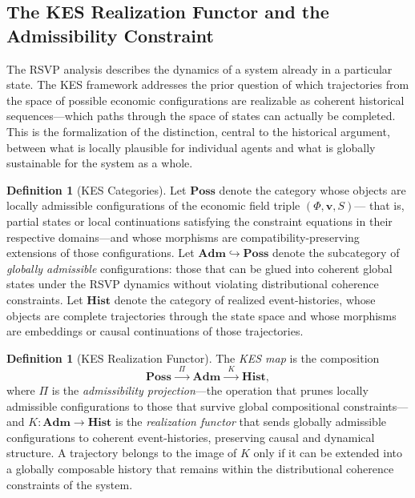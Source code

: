 \documentclass[11pt, a4paper]{article}
\theoremstyle{plain}
\theoremstyle{definition}
\newtheorem{definition}[theorem]{Definition}
\newcommand{\Phifield}{\Phi}
\newcommand{\vfield}{\mathbf{v}}
\newcommand{\Sfield}{S}
\newcommand{\Poss}{\mathbf{Poss}}
\newcommand{\Adm}{\mathbf{Adm}}
\newcommand{\Hist}{\mathbf{Hist}}
\newcommand{\KES}{K}
\begin{document}
\subsection{The KES Realization Functor and the Admissibility Constraint}

The RSVP analysis describes the dynamics of a system already in a particular
state. The KES framework addresses the prior question of which trajectories
from the space of possible economic configurations are realizable as coherent
historical sequences---which paths through the space of states can actually
be completed. This is the formalization of the distinction, central to the
historical argument, between what is locally plausible for individual agents
and what is globally sustainable for the system as a whole.

\begin{definition}[KES Categories]
Let $\Poss$ denote the category whose objects are locally admissible
configurations of the economic field triple $(\Phifield, \vfield, \Sfield)$---
that is, partial states or local continuations satisfying the constraint
equations in their respective domains---and whose morphisms are
compatibility-preserving extensions of those configurations. Let
$\Adm \hookrightarrow \Poss$ denote the subcategory of \emph{globally
admissible} configurations: those that can be glued into coherent global
states under the RSVP dynamics without violating distributional coherence
constraints. Let $\Hist$ denote the category of realized event-histories,
whose objects are complete trajectories through the state space and whose
morphisms are embeddings or causal continuations of those trajectories.
\end{definition}

\begin{definition}[KES Realization Functor]
The \emph{KES map} is the composition
\[
  \Poss \xrightarrow{\;\;\Pi\;\;} \Adm \xrightarrow{\;\;\KES\;\;} \Hist,
\]
where $\Pi$ is the \emph{admissibility projection}---the operation that prunes
locally admissible configurations to those that survive global compositional
constraints---and $\KES : \Adm \to \Hist$ is the \emph{realization functor}
that sends globally admissible configurations to coherent event-histories,
preserving causal and dynamical structure. A trajectory belongs to the image
of $\KES$ only if it can be extended into a globally composable history that
remains within the distributional coherence constraints of the system.
\end{definition}
\end{document}
